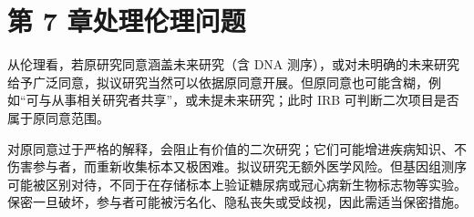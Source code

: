 \section{第 7 章\quad 处理伦理问题}
\begin{answerlist}
\item[1a.] 从伦理看，若原研究同意涵盖未来研究（含 DNA 测序），或对未明确的未来研究给予广泛同意，拟议研究当然可以依据原同意开展。但原同意也可能含糊，例如“可与从事相关研究者共享”，或未提未来研究；此时 IRB 可判断二次项目是否属于原同意范围。
\item[1b.] 对原同意过于严格的解释，会阻止有价值的二次研究；它们可能增进疾病知识、不伤害参与者，而重新收集标本又极困难。拟议研究无额外医学风险。但基因组测序可能被区别对待，不同于在存储标本上验证糖尿病或冠心病新生物标志物等实验。保密一旦破坏，参与者可能被污名化、隐私丧失或受歧视，因此需适当保密措施。


\end{answerlist}
